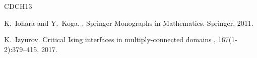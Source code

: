 \documentclass[oneside,english]{amsart}
\numberwithin{equation}{section}
\numberwithin{figure}{section}
\theoremstyle{plain}
\theoremstyle{plain}
\theoremstyle{plain}
\theoremstyle{remark}
\theoremstyle{plain}
\theoremstyle{plain}
\theoremstyle{plain}
\theoremstyle{plain}
\theoremstyle{plain}
\theoremstyle{plain}
\theoremstyle{plain}
\theoremstyle{plain}
\begin{document}
\begin{thebibliography}{CDCH{\etalchar{+}}13}







K.~Iohara and Y.~Koga.
.
\newblock Springer Monographs in Mathematics. Springer, 2011.
 


K.~Izyurov.
\newblock Critical {I}sing interfaces in multiply-connected domains
, 167(1-2):379--415, 2017.


\end{thebibliography}
\end{document}
